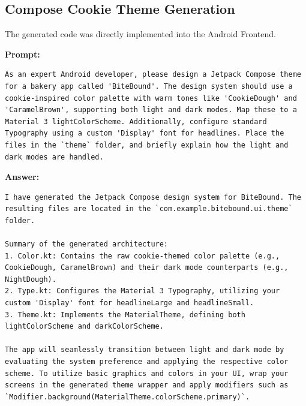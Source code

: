 \subsection*{Compose Cookie Theme Generation}

The generated code was directly implemented into the Android Frontend.

\textbf{Prompt:}
\begin{lstlisting}[language={}, breaklines=true]
As an expert Android developer, please design a Jetpack Compose theme for a bakery app called 'BiteBound'. The design system should use a cookie-inspired color palette with warm tones like 'CookieDough' and 'CaramelBrown', supporting both light and dark modes. Map these to a Material 3 lightColorScheme. Additionally, configure standard Typography using a custom 'Display' font for headlines. Place the files in the `theme` folder, and briefly explain how the light and dark modes are handled.
\end{lstlisting}
\textbf{Answer:}
\begin{lstlisting}[language={}, breaklines=true]
I have generated the Jetpack Compose design system for BiteBound. The resulting files are located in the `com.example.bitebound.ui.theme` folder. 

Summary of the generated architecture:
1. Color.kt: Contains the raw cookie-themed color palette (e.g., CookieDough, CaramelBrown) and their dark mode counterparts (e.g., NightDough).
2. Type.kt: Configures the Material 3 Typography, utilizing your custom 'Display' font for headlineLarge and headlineSmall.
3. Theme.kt: Implements the MaterialTheme, defining both lightColorScheme and darkColorScheme. 

The app will seamlessly transition between light and dark mode by evaluating the system preference and applying the respective color scheme. To utilize basic graphics and colors in your UI, wrap your screens in the generated theme wrapper and apply modifiers such as `Modifier.background(MaterialTheme.colorScheme.primary)`.
\end{lstlisting}
